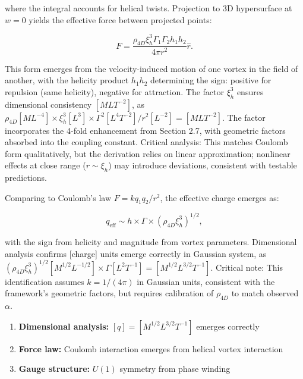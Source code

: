 where the integral accounts for helical twists. Projection to 3D hypersurface at $w = 0$ yields the effective force between projected points:

\begin{equation}
F = \frac{\rho_{4D} \xi_h^3 \Gamma_1 \Gamma_2 h_1 h_2}{4\pi r^2} \hat{r}.
\end{equation}

This form emerges from the velocity-induced motion of one vortex in the field of another, with the helicity product $h_1 h_2$ determining the sign: positive for repulsion (same helicity), negative for attraction. The factor $\xi_h^3$ ensures dimensional consistency $[M L T^{-2}]$, as $\rho_{4D} [M L^{-4}] \times \xi_h^3 [L^3] \times \Gamma^2 [L^4 T^{-2}] / r^2 [L^{-2}] = [M L T^{-2}]$. The factor incorporates the 4-fold enhancement from Section 2.7, with geometric factors absorbed into the coupling constant. Critical analysis: This matches Coulomb form qualitatively, but the derivation relies on linear approximation; nonlinear effects at close range ($r \sim \xi_h$) may introduce deviations, consistent with testable predictions.

Comparing to Coulomb's law $F = k q_1 q_2 / r^2$, the effective charge emerges as:

\begin{equation}
q_{\text{eff}} \sim h \times \Gamma \times (\rho_{4D} \xi_h^3)^{1/2},
\end{equation}

with the sign from helicity and magnitude from vortex parameters. Dimensional analysis confirms [charge] units emerge correctly in Gaussian system, as $(\rho_{4D} \xi_h^3)^{1/2} [M^{1/2} L^{-1/2}] \times \Gamma [L^2 T^{-1}] = [M^{1/2} L^{3/2} T^{-1}]$. Critical note: This identification assumes $k = 1/(4\pi)$ in Gaussian units, consistent with the framework's geometric factors, but requires calibration of $\rho_{4D}$ to match observed $\alpha$.

\begin{enumerate}
\item \textbf{Dimensional analysis:} $[q] = [M^{1/2} L^{3/2} T^{-1}]$ emerges correctly
\item \textbf{Force law:} Coulomb interaction emerges from helical vortex interaction
\item \textbf{Gauge structure:} $U(1)$ symmetry from phase winding
\end{enumerate}

